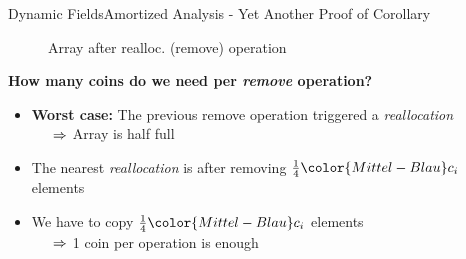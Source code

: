 
\begin{frame}{Dynamic Fields}{Amortized Analysis -
    Yet Another Proof of Corollary}
  \vspace{-2.0em}
  \begin{figure}[!h]%
    \def\FSAsize{14}\def\FSAelements{0}%
    \def\FSAcopy{7}\def\FSAdelete{1}\def\FSAinsert{0}%
    \def\FSAcopyarrow{1}%
    \def\FSAinsertarrow{1}%
    \def\FSAlabelsize{\raisebox{1.75em}{$\begin{array}{c}
        {\color{Mittel-Blau}s_{i-1}-1}\\
        \text{old elements}
        \end{array}$}}%
    \def\FSAlabelinsertcapacity{removed elements}%
    \def\FSAlabelcapacity{${\color{Mittel-Blau}c_i}
      = \frac{1}{2} \cdot {\color{Mittel-Blau}c_{i-1}}$}%
    \vspace{-0.5em}%
    \caption{Array after realloc. (remove) operation}
    \label{fig:dynamic_fields:amortized_analysis:yapoc_array_shrink}
  \end{figure}
  \vspace*{-1.0em}
  \textbf{How many coins do we need per \textit{remove} operation?}
  \begin{itemize}
    \item
      \textbf{Worst case:}
      The previous remove operation triggered a \textit{reallocation}\\
      $\hspace{1.5em}\Rightarrow$ Array is half full
    \item
      The nearest \textit{reallocation} is after removing
      $\frac{1}{4} {\color{Mittel-Blau}c_i}$ elements
    \item
      We have to copy $\frac{1}{4} {\color{Mittel-Blau}c_i}$ elements\\
      $\hspace{1.5em}\Rightarrow$ 1 coin per operation is enough
  \end{itemize}
\end{frame}